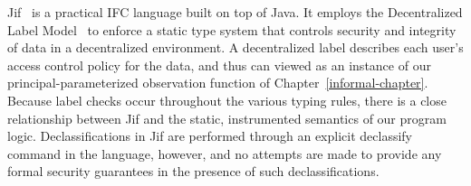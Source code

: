 \begin{comment}
Delimited Release~\cite{delimited} is an IFC system that allows certain prespecified
expressions (called \emph{escape hatches}) to be declassified. For example, a declassification 
policy for high-security variable $h$ might say that the expression $h\%2$ should be considered
low security. Relaxed Noninterference~\cite{relaxed} uses a similar idea, but builds a lattice of
semantic declassification policies, rather than syntactic escape hatches~--- e.g., $h$ would 
have a policy of $\lambda x \such x\%2$. Our system can easily express any policy from these systems,
using a precondition saying that some low-security data is equal to the escape hatch function 
applied to the secret data.  Our strong security guarantee is identical to the formal guarantees of 
both of these systems, saying that the high-security value will not affect the observable behavior as 
long as the escape hatch valuation is unchanged.

Relational Hoare Type Theory (RHTT)~\cite{rhtt} is a logic framework for verifying information-flow
properties. It is based on a highly general relational logic. The system can be used to reason about 
a wide variety of security-related
notions, including declassification, information erasure, and state-dependent access control. One
advantage of our program logic over RHTT is that we have fine-tuned our system for reasoning about 
noninterference. A program verification in our logic
requires a relatively small amount of work, since much of the noninterference proof is already handled
by the framework. RHTT, on the other hand, is extremely general to the point that if you want to
prove an information flow property on a program, you need to formulate
the property as a relational type and manually prove that the program has that type. This has to be
done for each program on an individual basis~--- there are no overarching security properties that
hold for all verified programs.
\end{comment}

Jif~\cite{jif} is a practical IFC language built on top of Java. It employs the Decentralized
Label Model~\cite{dlm} to enforce a static type system that controls security and integrity of 
data in a decentralized environment.
A decentralized label describes each user's access control policy for the data, and thus
can viewed as an instance of our principal-parameterized observation function of
Chapter~\ref{informal-chapter}. Because label checks occur throughout the various typing rules,
there is a close relationship between Jif and the static, instrumented semantics of 
our program logic. Declassifications in Jif are performed through an explicit declassify 
command in the language, however, and no attempts are made to provide any formal 
security guarantees in the presence of such declassifications.

